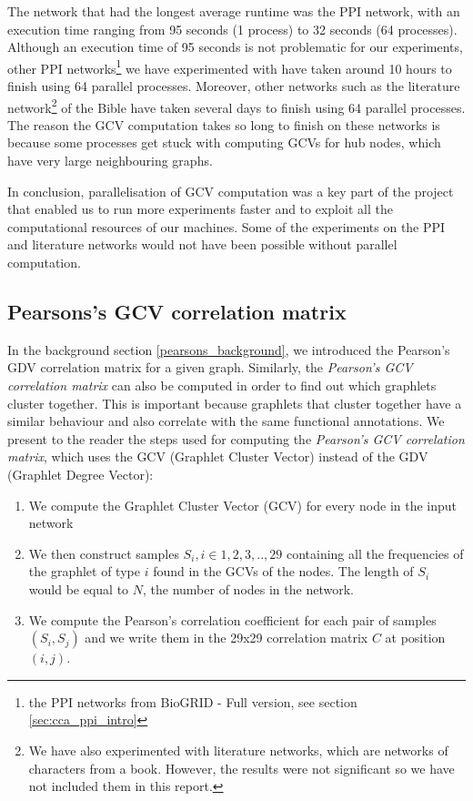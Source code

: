 The network that had the longest average runtime was the PPI network, with an execution time ranging from 95 seconds (1 process) to 32 seconds (64 processes). Although an execution time of 95 seconds is not problematic for our experiments, other PPI networks\footnote{the PPI networks from BioGRID - Full version, see section \ref{sec:cca_ppi_intro}} we have experimented with have taken around 10 hours to finish using 64 parallel processes. Moreover, other networks such as the literature network\footnote{We have also experimented with literature networks, which are networks of characters from a book. However, the results were not significant so we have not included them in this report.} of the Bible have taken several days to finish using 64 parallel processes. The reason the GCV computation takes so long to finish on these networks is because some processes get stuck with computing GCVs for hub nodes, which have very large neighbouring graphs.

In conclusion, parallelisation of GCV computation was a key part of the project that enabled us to run more experiments faster and to exploit all the computational resources of our machines. Some of the experiments on the PPI and literature networks would not have been possible without parallel computation.

\subsection{Pearsons's GCV correlation matrix}
\label{sec:metho_pears}

 In the background section \ref{pearsons_background}, we introduced the Pearson's GDV correlation matrix for a given graph. Similarly, the \emph{Pearson's GCV correlation matrix} can also be computed in order to find out which graphlets cluster together. This is important because graphlets that cluster together have a similar behaviour and also correlate with the same functional annotations. We present to the reader the steps used for computing the \emph{Pearson's GCV correlation matrix}, which uses the GCV (Graphlet Cluster Vector) instead of the GDV (Graphlet Degree Vector):
\begin{enumerate}
 \item We compute the Graphlet Cluster Vector (GCV) for every node in the
input network
 \item We then construct samples $ S_i, i\in {1,2,3, .. ,29} $
containing all the frequencies of the graphlet of type $i$ found in the GCVs of
the nodes. The length of $S_i$ would be equal to $N$, the number of nodes in the network.
 \item We compute the Pearson's correlation coefficient for each pair of samples $ (S_i, S_j) $ and we write them in the 29x29 correlation matrix $
C$ at position $(i,j)$.
\end{enumerate}

